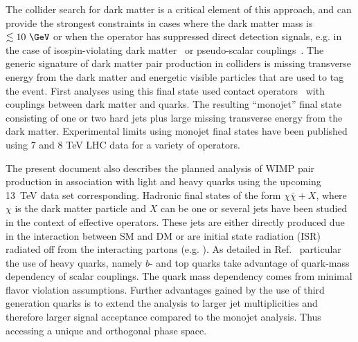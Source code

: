 The collider search for dark matter is a critical element of this approach, and can provide the strongest constraints in cases where the
dark matter mass is $\lesssim 10\ \GeV$ or when the operator has suppressed direct detection signals, e.g. in the case of isospin-violating dark matter~\cite{Feng:2011vu} or pseudo-scalar couplings~\cite{Buckley:2014fba}.  The generic signature of dark matter pair production in colliders is missing transverse energy from the dark matter and energetic visible particles that are used to tag
the event.  First analyses using this final state used contact operators~\cite{Goodman:2010ku} with couplings between dark matter and quarks. The resulting ``monojet'' final state
consisting of one or two hard jets plus large missing transverse energy from the dark matter. Experimental limits using monojet final
states have been published using 7 and 8 TeV LHC data \cite{Chatrchyan:2012me,ATLAS:2012ky}
for a variety of operators. 




The present document also describes the planned analysis of WIMP pair production in association with light and heavy quarks using the upcoming 13~TeV data set corresponding. 
Hadronic final states of the form $\chi \bar \chi + X$, where $\chi$ is the dark matter particle and $X$ can be one or several jets have been studied in the context of effective operators. These jets are either directly produced due in the interaction between SM and DM or are initial state radiation (ISR)  radiated off from the interacting partons (e.g. \cite{Goodman:2010yf,Fox:2011pm,Petriello:2008pu,Fox:2011fx}). As detailed in Ref.~\cite{Lin:2013sca, Artoni:2013zba} particular the use of heavy quarks, namely $b$- and top quarks take advantage of quark-mass dependency of scalar couplings. The quark mass dependency comes from minimal flavor violation assumptions. Further advantages gained by the use of third generation quarks is to extend the analysis to larger jet multiplicities and therefore larger signal acceptance compared to the monojet analysis. Thus accessing a unique and orthogonal phase space. 


